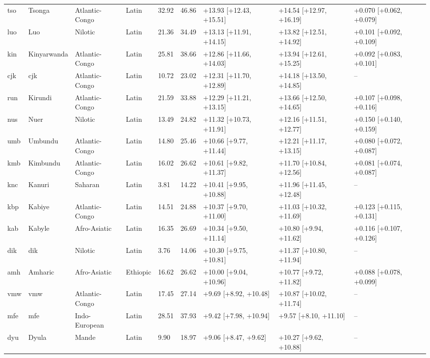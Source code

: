 {\begin{longtable}{@{}lllllrlll@{}}
tso & Tsonga & Atlantic-Congo & Latin & 32.92 & 46.86 & +13.93 [+12.43, +15.51] & +14.54 [+12.97, +16.19] & +0.070 [+0.062, +0.079] \\
luo & Luo & Nilotic & Latin & 21.36 & 34.49 & +13.13 [+11.91, +14.15] & +13.82 [+12.51, +14.92] & +0.101 [+0.092, +0.109] \\
kin & Kinyarwanda & Atlantic-Congo & Latin & 25.81 & 38.66 & +12.86 [+11.66, +14.03] & +13.94 [+12.61, +15.25] & +0.092 [+0.083, +0.101] \\
cjk & cjk & Atlantic-Congo & Latin & 10.72 & 23.02 & +12.31 [+11.70, +12.89] & +14.18 [+13.50, +14.85] & -- \\
run & Kirundi & Atlantic-Congo & Latin & 21.59 & 33.88 & +12.29 [+11.21, +13.15] & +13.66 [+12.50, +14.65] & +0.107 [+0.098, +0.116] \\
nus & Nuer & Nilotic & Latin & 13.49 & 24.82 & +11.32 [+10.73, +11.91] & +12.16 [+11.51, +12.77] & +0.150 [+0.140, +0.159] \\
umb & Umbundu & Atlantic-Congo & Latin & 14.80 & 25.46 & +10.66 [+9.77, +11.44] & +12.21 [+11.17, +13.15] & +0.080 [+0.072, +0.087] \\
kmb & Kimbundu & Atlantic-Congo & Latin & 16.02 & 26.62 & +10.61 [+9.82, +11.37] & +11.70 [+10.84, +12.56] & +0.081 [+0.074, +0.087] \\
knc & Kanuri & Saharan & Latin & 3.81 & 14.22 & +10.41 [+9.95, +10.88] & +11.96 [+11.45, +12.48] & -- \\
kbp & Kabiye & Atlantic-Congo & Latin & 14.51 & 24.88 & +10.37 [+9.70, +11.00] & +11.03 [+10.32, +11.69] & +0.123 [+0.115, +0.131] \\
kab & Kabyle & Afro-Asiatic & Latin & 16.35 & 26.69 & +10.34 [+9.50, +11.14] & +10.80 [+9.94, +11.62] & +0.116 [+0.107, +0.126] \\
dik & dik & Nilotic & Latin & 3.76 & 14.06 & +10.30 [+9.75, +10.81] & +11.37 [+10.80, +11.94] & -- \\
amh & Amharic & Afro-Asiatic & Ethiopic & 16.62 & 26.62 & +10.00 [+9.04, +10.96] & +10.77 [+9.72, +11.82] & +0.088 [+0.078, +0.099] \\
vmw & vmw & Atlantic-Congo & Latin & 17.45 & 27.14 & +9.69 [+8.92, +10.48] & +10.87 [+10.02, +11.74] & -- \\
mfe & mfe & Indo-European & Latin & 28.51 & 37.93 & +9.42 [+7.98, +10.94] & +9.57 [+8.10, +11.10] & -- \\
dyu & Dyula & Mande & Latin & 9.90 & 18.97 & +9.06 [+8.47, +9.62] & +10.27 [+9.62, +10.88] & -- \\

\end{longtable}}
